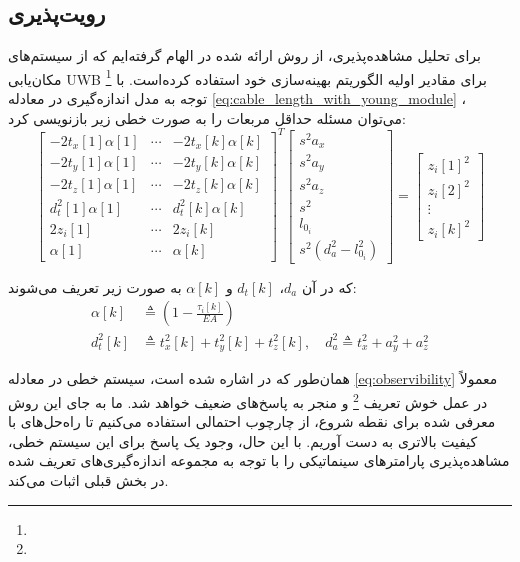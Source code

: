 \subsection{رویت‌پذیری}
برای تحلیل مشاهده‌پذیری، از روش ارائه شده در
\cite{blueml2021bias}
الهام گرفته‌ایم که از سیستم‌های مکان‌یابی  UWB 
\footnote{}
برای مقادیر اولیه الگوریتم بهینه‌سازی خود استفاده کرده‌است. با توجه به مدل اندازه‌گیری در معادله
\ref{eq:cable_length_with_young_module}
، می‌توان مسئله حداقل مربعات را به صورت خطی زیر بازنویسی کرد:
\begin{equation}\label{eq:observibility}
	\begin{bmatrix}
		-2t_x[1]\alpha[1] & \cdots & -2t_x[k]\alpha[k] \\
		-2t_y[1]\alpha[1] & \cdots & -2t_y[k]\alpha[k] \\
		-2t_z[1]\alpha[1] & \cdots & -2t_z[k]\alpha[k] \\
		d^2_t[1]\alpha[1] & \cdots & d^2_t[k]\alpha[k] \\
		2z_i[1] & \cdots & 2z_i[k] \\
		\alpha[1] & \cdots & \alpha[k]
	\end{bmatrix}^T
	\begin{bmatrix}
		s^2 a_x \\
		s^2 a_y \\
		s^2 a_z \\
		s^2 \\
		l_{0_i} \\
		s^2 (d^2_a - l_{0_i}^2)
	\end{bmatrix}
	=
	\begin{bmatrix}
		z_i[1]^2 \\
		z_i[2]^2 \\
		\vdots \\
		z_i[k]^2
	\end{bmatrix}
\end{equation}

که در آن \( d_a \)، \( d_t[k] \) و \( \alpha[k] \) به صورت زیر تعریف می‌شوند:
\begin{equation}
	\begin{split}
		\alpha[k] &\triangleq \left(1 - \frac{\tau_i[k]}{EA}\right) \\
		d^2_t[k] &\triangleq t^2_x[k] + t^2_y[k] + t^2_z[k], \quad d^2_a \triangleq t^2_x + a^2_y + a^2_z
	\end{split}
\end{equation}

همان‌طور که در 
\cite{blueml2021bias}
اشاره شده است، سیستم خطی در معادله 
\ref{eq:observibility}
معمولاً در عمل خوش تعریف
\footnote{}
و منجر به پاسخ‌های ضعیف خواهد شد. ما به جای این روش معرفی شده برای نقطه شروع، از چارچوب احتمالی استفاده می‌کنیم تا راه‌حل‌های با کیفیت بالاتری به دست آوریم. با این حال، وجود یک پاسخ برای این سیستم خطی، مشاهده‌پذیری پارامترهای سینماتیکی را با توجه به مجموعه اندازه‌گیری‌های تعریف شده در بخش قبلی اثبات می‌کند.









